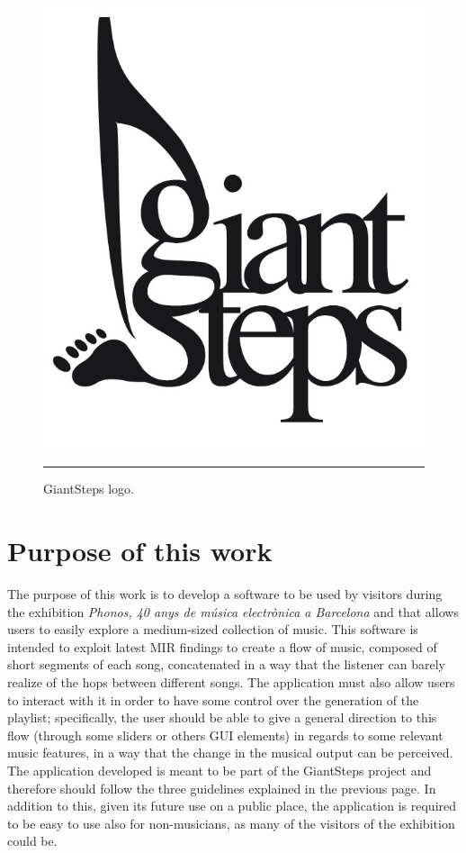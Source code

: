 \begin{figure}[htbp]
  \centering
    \includegraphics{Figures/giantsteps.png}
    \rule{35em}{0.5pt}
  \caption[GiantSteps]{GiantSteps logo.}
  \label{fig:GiantSteps}
\end{figure}


\section{Purpose of this work}
The purpose of this work is to develop a software to be used by visitors during the exhibition \textit{Phonos, 40 anys de música electrònica a Barcelona} and that allows users to easily explore a medium-sized collection of music. This software is intended to exploit latest MIR findings to create a flow of music, composed of short segments of each song, concatenated in a way that the listener can barely realize of the hops between different songs. The application must also allow users to interact with it in order to have some control over the generation of the playlist; specifically, the user should be able to give a general direction to this flow (through some sliders or others GUI elements) in regards to some relevant music features, in a way that the change in the musical output can be perceived. The application developed is meant to be part of the GiantSteps project and therefore should follow the three guidelines explained in the previous page. In addition to this, given its future use on a public place, the application is required to be easy to use also for non-musicians, as many of the visitors of the exhibition could be.

